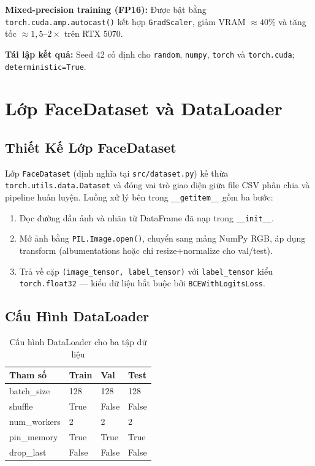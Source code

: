 \textbf{Mixed-precision training (FP16):} Được bật bằng \texttt{torch.cuda.amp.autocast()} kết hợp \texttt{GradScaler}, giảm VRAM $\approx 40\%$ và tăng tốc $\approx 1{,}5$--$2\times$ trên RTX 5070.

\textbf{Tái lập kết quả:} Seed 42 cố định cho \texttt{random}, \texttt{numpy}, \texttt{torch} và \texttt{torch.cuda}; \texttt{deterministic=True}.

\section{Lớp FaceDataset và DataLoader}

\subsection{Thiết Kế Lớp FaceDataset}

Lớp \texttt{FaceDataset} (định nghĩa tại \texttt{src/dataset.py}) kế thừa \texttt{torch.utils.data.Dataset} và đóng vai trò giao diện giữa file CSV phân chia và pipeline huấn luyện. Luồng xử lý bên trong \texttt{\_\_getitem\_\_} gồm ba bước:

\begin{enumerate}
  \item Đọc đường dẫn ảnh và nhãn từ DataFrame đã nạp trong \texttt{\_\_init\_\_}.
  \item Mở ảnh bằng \texttt{PIL.Image.open()}, chuyển sang mảng NumPy RGB, áp dụng transform (albumentations hoặc chỉ resize+normalize cho val/test).
  \item Trả về cặp \texttt{(image\_tensor, label\_tensor)} với \texttt{label\_tensor} kiểu \texttt{torch.float32} --- kiểu dữ liệu bắt buộc bởi \texttt{BCEWithLogitsLoss}.
\end{enumerate}

\subsection{Cấu Hình DataLoader}

\begin{table}[H]
  \centering
  \caption{Cấu hình DataLoader cho ba tập dữ liệu}
  \label{tab:dataloader}
  \begin{tabular}{llll}
    \toprule
    \textbf{Tham số} & \textbf{Train} & \textbf{Val} & \textbf{Test} \\
    \midrule
    batch\_size   & 128  & 128  & 128  \\
    shuffle       & True & False & False \\
    num\_workers  & 2    & 2    & 2    \\
    pin\_memory   & True & True & True \\
    drop\_last    & False & False & False \\
    \bottomrule
  \end{tabular}
\end{table}

